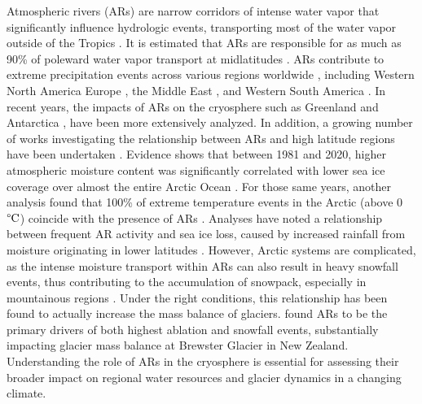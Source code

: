 \documentclass[12pts,draft]{AR_analysis_}
\begin{document}
Atmospheric rivers (ARs) are narrow corridors of intense water vapor
that significantly influence hydrologic events, transporting
most of the water vapor outside of the Tropics \cite{AR_def}.
It is estimated that ARs are responsible for as much as 90\% of poleward
water vapor transport at midlatitudes \cite{other_alg}. ARs contribute to
extreme precipitation events across various regions worldwide 
\cite{Espinoza2018, Massoud2019}, including
Western North America \cite{Dettinger2004, Neiman2008, Guan2010,
ARs_flood_WA_State, ARs_flood_Russian_River_CA, Ralph2013, ARs_CA}
Europe \cite{Lavers2013, ARs_impact_Norway}, the Middle East \cite{massoud2020, 
Lashkari2020, Esfandiari2024}, and Western South America
\cite{ARs_impact_SA}. In recent years, the impacts of ARs on the cryosphere
such as Greenland \cite{Mattingly2018} and Antarctica \cite{Gorodetskaya2014, 
Wille2021, Maclennan2022}, have been more extensively analyzed. 
In addition, a growing number of works 
investigating the relationship between ARs and 
high latitude regions have been undertaken 
\cite{Hegyi2018, Wang2024}. Evidence shows that between
1981 and 2020, higher atmospheric moisture content was significantly correlated
with lower sea ice coverage over almost the entire Arctic Ocean
\cite{ARs_lead_to_sea_ice_loss}. For those same years, another analysis
found that 100\% of extreme temperature events in the Arctic (above 0
$\mathrm{\degree C}$) coincide with the presence of 
ARs \cite{Ma2023}. Analyses have noted
a relationship between frequent AR activity and sea ice loss, caused by
increased rainfall from moisture originating in lower latitudes
\cite{Zhang2023, maclennan_contribution_2022}. However, Arctic systems
are complicated, as the intense moisture transport within ARs can also
result in heavy snowfall events, thus contributing to the accumulation
of snowpack, especially in mountainous regions \cite{Saavedra2020,
Guan2010}. Under the right conditions, this relationship has been found
to actually increase the mass balance of glaciers.
 found ARs to be the primary drivers of both highest
ablation and snowfall events, substantially impacting glacier mass
balance at Brewster Glacier in New Zealand. 
Understanding the role of ARs in the cryosphere is essential for
assessing their broader impact on regional water resources and glacier
dynamics in a changing climate. 
\end{document}
